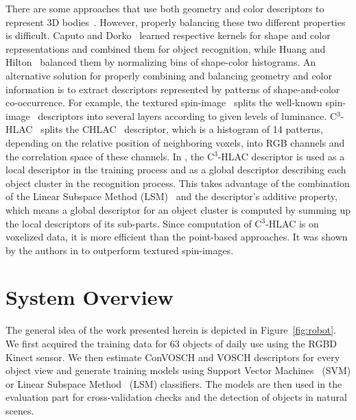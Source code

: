 \documentclass[a4paper, 10 pt, conference]{sty/ieeeconf}
\begin{document}
There are some approaches that use both geometry and color descriptors to
represent 3D bodies~\cite{park2006}. However, properly balancing these two
different properties is difficult.  Caputo and Dorko~\cite{caputo2002} learned
respective kernels for shape and color representations and combined them for
object recognition, while Huang and Hilton~\cite{huang2009} balanced them by
normalizing bins of shape-color histograms.  An alternative solution for properly combining
and balancing geometry and color information is to extract descriptors
represented by patterns of shape-and-color co-occurrence.  For example, the textured
spin-image~\cite{cortelazzo2006} splits the well-known
spin-image~\cite{Johnson_spin_images} descriptors into several layers
according to given levels of luminance. C$^3$-HLAC~\cite{kanezaki2011icra} 
splits the CHLAC~\cite{kobayashi2004} descriptor, which is a histogram of 14 patterns, 
depending on the relative position of neighboring voxels, into RGB channels and the correlation 
space of these channels.  In \cite{kanezaki2011icra}, the C$^3$-HLAC descriptor is used as a local
descriptor in the training process and as a global descriptor describing each
object cluster in the recognition process. This takes advantage of the combination
of the Linear Subspace Method (LSM)~\cite{watanabe1973} and the descriptor's additive property, 
which means a global descriptor for an object cluster is computed by summing up the local descriptors of its sub-parts.
Since computation of C$^3$-HLAC is on voxelized data, it is more efficient
than the point-based approaches. It was shown by the authors in \cite{kanezaki2011icra} to outperform textured spin-images.

\section{System Overview}
\label{sec:overview}
The general idea of the work presented herein is depicted in 
Figure~\ref{fig:robot}. We first acquired the training data for 63 objects
of daily use using the RGBD Kinect sensor. We then estimate ConVOSCH and VOSCH descriptors 
for every object view and generate training models using Support Vector
Machines~\cite{svm99} (SVM) or Linear Subspace Method~\cite{watanabe1973} (LSM) classifiers. The models are then used
in the evaluation part for cross-validation checks and the detection of 
objects in natural scenes.
\end{document}
